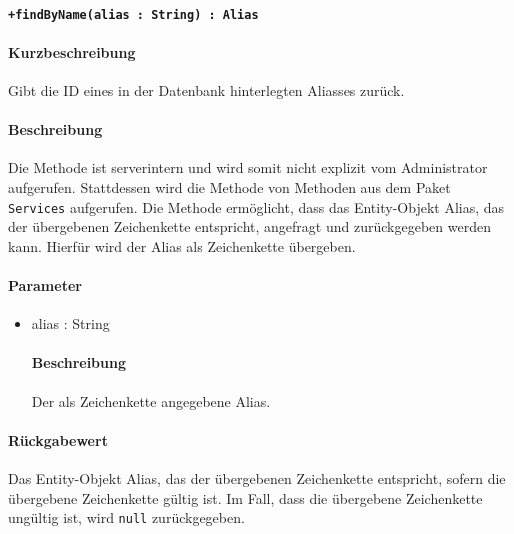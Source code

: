 \paragraph*{\texttt{+findByName(alias : String) : Alias}}%
\paragraph*{Kurzbeschreibung}
Gibt die ID eines in der Datenbank hinterlegten Aliasses zurück.
\paragraph*{Beschreibung}
Die Methode ist serverintern und wird somit nicht explizit vom Administrator aufgerufen.
Stattdessen wird die Methode von Methoden aus dem Paket \texttt{Services} aufgerufen.
Die Methode ermöglicht, dass das Entity-Objekt Alias, das der übergebenen Zeichenkette entspricht, angefragt und zurückgegeben werden kann.
Hierfür wird der Alias als Zeichenkette übergeben.
\paragraph*{Parameter}
\begin{itemize}
    \item alias : String
    		\paragraph*{Beschreibung}
    		Der als Zeichenkette angegebene Alias.
\end{itemize}
\paragraph*{Rückgabewert}
Das Entity-Objekt Alias, das der übergebenen Zeichenkette entspricht, sofern die übergebene Zeichenkette gültig ist.
Im Fall, dass die übergebene Zeichenkette ungültig ist, wird \texttt{null} zurückgegeben.
